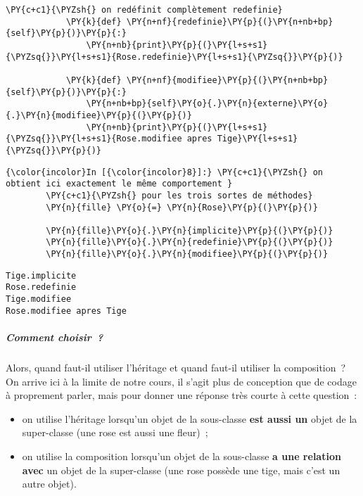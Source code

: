 \begin{Verbatim}[commandchars=\\\{\}]
            \PY{c+c1}{\PYZsh{} on redéfinit complètement redefinie}
            \PY{k}{def} \PY{n+nf}{redefinie}\PY{p}{(}\PY{n+nb+bp}{self}\PY{p}{)}\PY{p}{:}
                \PY{n+nb}{print}\PY{p}{(}\PY{l+s+s1}{\PYZsq{}}\PY{l+s+s1}{Rose.redefinie}\PY{l+s+s1}{\PYZsq{}}\PY{p}{)}
                
            \PY{k}{def} \PY{n+nf}{modifiee}\PY{p}{(}\PY{n+nb+bp}{self}\PY{p}{)}\PY{p}{:}
                \PY{n+nb+bp}{self}\PY{o}{.}\PY{n}{externe}\PY{o}{.}\PY{n}{modifiee}\PY{p}{(}\PY{p}{)}
                \PY{n+nb}{print}\PY{p}{(}\PY{l+s+s1}{\PYZsq{}}\PY{l+s+s1}{Rose.modifiee apres Tige}\PY{l+s+s1}{\PYZsq{}}\PY{p}{)}
\end{Verbatim}


    \begin{Verbatim}[commandchars=\\\{\}]
{\color{incolor}In [{\color{incolor}8}]:} \PY{c+c1}{\PYZsh{} on obtient ici exactement le même comportement }
        \PY{c+c1}{\PYZsh{} pour les trois sortes de méthodes}
        \PY{n}{fille} \PY{o}{=} \PY{n}{Rose}\PY{p}{(}\PY{p}{)}
        
        \PY{n}{fille}\PY{o}{.}\PY{n}{implicite}\PY{p}{(}\PY{p}{)}
        \PY{n}{fille}\PY{o}{.}\PY{n}{redefinie}\PY{p}{(}\PY{p}{)}
        \PY{n}{fille}\PY{o}{.}\PY{n}{modifiee}\PY{p}{(}\PY{p}{)}
\end{Verbatim}


    \begin{Verbatim}[commandchars=\\\{\}]
Tige.implicite
Rose.redefinie
Tige.modifiee
Rose.modifiee apres Tige

    \end{Verbatim}

    \hypertarget{comment-choisir}{%
\subparagraph{Comment choisir~?}\label{comment-choisir}}

    Alors, quand faut-il utiliser l'héritage et quand faut-il utiliser la
composition~?\\
On arrive ici à la limite de notre cours, il s'agit plus de conception
que de codage à proprement parler, mais pour donner une réponse très
courte à cette question~:

\begin{itemize}
\tightlist
\item
  on utilise l'héritage lorsqu'un objet de la sous-classe \textbf{est
  aussi un} objet de la super-classe (une rose est aussi une fleur)~;
\item
  on utilise la composition lorsqu'un objet de la sous-classe \textbf{a
  une relation avec} un objet de la super-classe (une rose possède une
  tige, mais c'est un autre objet).
\end{itemize}


